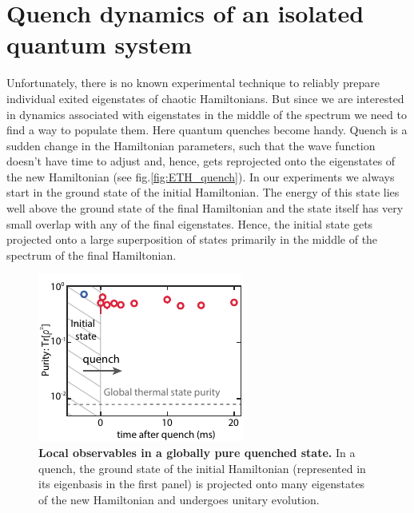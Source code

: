 \section{Quench dynamics of an isolated quantum system}

Unfortunately, there is no known experimental technique to reliably prepare individual exited eigenstates of chaotic Hamiltonians. But since we are interested in dynamics associated with eigenstates in the middle of the spectrum we need to find a way to populate them. Here quantum quenches become handy. Quench is a sudden change in the Hamiltonian parameters, such that the wave function doesn't have time to adjust and, hence, gets reprojected onto the eigenstates of the new Hamiltonian (see fig.\ref{fig:ETH_quench}). In our experiments we always start in the ground state of the initial Hamiltonian. The energy of this state lies well above the ground state of the final Hamiltonian and the state itself has very small overlap with any of the final eigenstates. Hence, the initial state gets projected onto a large superposition of states primarily in the middle of the spectrum of the final Hamiltonian. 

\begin{figure}[t!]
	\centering
	\includegraphics[scale=2.0]{figures/ETH_quench.pdf}
	\caption{{\bf Local observables in a globally pure quenched state.} In a quench, the ground state of the initial Hamiltonian (represented in its eigenbasis in the first panel) is projected onto many eigenstates of the new Hamiltonian and undergoes unitary evolution.}
	\label{fig:ETH}
\end{figure}

